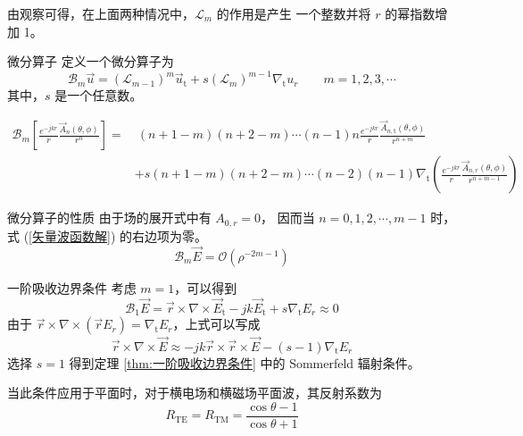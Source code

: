 \par 由观察可得，在上面两种情况中，$\mathcal{L}_m$ 的作用是产生
一个整数并将 $r$ 的幂指数增加 1。

\begin{definition}{微分算子}
    定义一个微分算子为
    \begin{equation}
        \mathcal{B}_m\vec{u}
        =(\mathcal{L}_{m-1})^m \vec{u}_{\text{t}}
        +s (\mathcal{L}_{m})^{m-1} \nabla_{\text{t}}u_{r}
        \qquad
        m=1,2,3,\cdots
    \end{equation}
    其中，$s$ 是一个任意数。
\end{definition}

\begin{lemma}
    \begin{equation}
        \begin{aligned}
            \mathcal{B}_m \left[
                \frac{e^{-jkr}}{r}
                \frac{\vec{A}_{n}(\theta, \phi)}{r^n}
            \right]
            =&\ (n+1-m)(n+2-m)\cdots(n-1)n 
            \frac{e^{-jkr}}{r}
            \frac{\vec{A}_{n,\text{t}}(\theta, \phi)}{r^{n+m}}\\
            &+s(n+1-m)(n+2-m)\cdots(n-2)(n-1)
            \nabla_{\text{t}}\left(
                \frac{e^{-jkr}}{r}
                \frac{\vec{A}_{n,r}(\theta, \phi)}{r^{n+m-1}}
            \right)
        \end{aligned}
    \end{equation}
\end{lemma}

\begin{theorem}{微分算子的性质}
    由于场的展开式中有 $A_{0,r}=0$，
    因而当 $n=0,1,2,\cdots,m-1$ 时，
    式 (\ref{矢量波函数解}) 的右边项为零。
    \begin{equation}
        \mathcal{B}_m\vec{E}=
        \mathcal{O}\left(
            \rho^{-2m-1}
        \right)
    \end{equation}
\end{theorem}

\begin{theorem}{一阶吸收边界条件}
    考虑 $m=1$，可以得到
    \begin{equation}
        \mathcal{B}_1\vec{E}
        =\vec{r}\times\nabla \times\vec{E}_{\text{t}}
        -jk\vec{E}_{\text{t}}+s\nabla_{\text{t}}E_r\approx 0
    \end{equation}
    由于 $\vec{r}\times\nabla \times(\vec{r}E_r)
    =\nabla_{\text{t}}E_r$，上式可以写成
    \begin{equation}
        \vec{r}\times\nabla \times\vec{E}
        \approx
        -jk\vec{r}\times\vec{r}\times\vec{E}-(s-1)\nabla_{\text{t}}E_r
    \end{equation}
    选择 $s=1$ 得到定理 \ref{thm:一阶吸收边界条件} 中的 Sommerfeld 辐射条件。

    当此条件应用于平面时，对于横电场和横磁场平面波，其反射系数为
    \begin{equation}
        R_{\text{TE}}
        =R_{\text{TM}}
        =\frac{\cos \theta - 1}{\cos \theta + 1}
    \end{equation}
\end{theorem}

